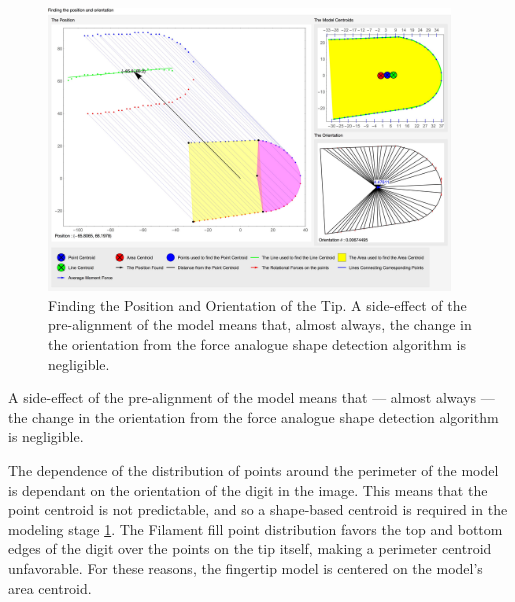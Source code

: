 \begin{figure}[h!]
  \centering
    \includegraphics[width=0.95\textwidth]{Chapter4/Figs/Model_Centroids_With_Pos_Orientation.jpg}
    \caption{Finding the Position and Orientation of the Tip. A side-effect of the pre-alignment of the model means that, almost always,  the change in the orientation from the force analogue shape detection algorithm is negligible. }\label{fig:PositionAndOrientation}
\end{figure}

A side-effect of the pre-alignment of the model means that --- almost always --- the change in the orientation from the force analogue shape detection algorithm is negligible.

The dependence of the distribution of points around the perimeter of the model is dependant on the orientation of the digit in the image. This means that the point centroid is not predictable, and so a shape-based centroid is required in the modeling stage \ref{fig:PositionAndOrientation}. The Filament fill point distribution favors the top and bottom edges of the digit over the points on the tip itself, making a perimeter centroid unfavorable. For these reasons, the fingertip model is centered on the model's area centroid.


